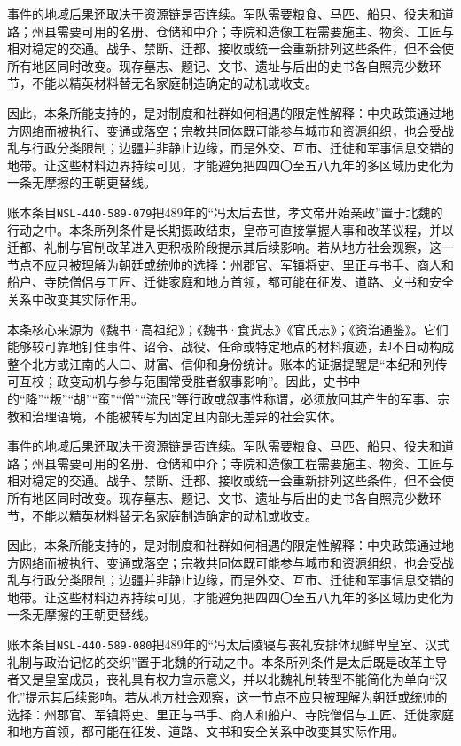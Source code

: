 事件的地域后果还取决于资源链是否连续。军队需要粮食、马匹、船只、役夫和道路；州县需要可用的名册、仓储和中介；寺院和造像工程需要施主、物资、工匠与相对稳定的交通。战争、禁断、迁都、接收或统一会重新排列这些条件，但不会使所有地区同时改变。现存墓志、题记、文书、遗址与后出的史书各自照亮少数环节，不能以精英材料替无名家庭制造确定的动机或收支。

因此，本条所能支持的，是对制度和社群如何相遇的限定性解释：中央政策通过地方网络而被执行、变通或落空；宗教共同体既可能参与城市和资源组织，也会受战乱与行政分类限制；边疆并非静止边缘，而是外交、互市、迁徙和军事信息交错的地带。让这些材料边界持续可见，才能避免把四四〇至五八九年的多区域历史化为一条无摩擦的王朝更替线。

账本条目\texttt{NSL-440-589-079}把489年的“冯太后去世，孝文帝开始亲政”置于北魏的行动之中。本条所列条件是长期摄政结束，皇帝可直接掌握人事和改革议程，并以迁都、礼制与官制改革进入更积极阶段提示其后续影响。若从地方社会观察，这一节点不应只被理解为朝廷或统帅的选择：州郡官、军镇将吏、里正与书手、商人和船户、寺院僧侣与工匠、迁徙家庭和地方首领，都可能在征发、道路、文书和安全关系中改变其实际作用。

本条核心来源为《魏书·高祖纪》；《魏书·食货志》《官氏志》；《资治通鉴》。它们能够较可靠地钉住事件、诏令、战役、任命或特定地点的材料痕迹，却不自动构成整个北方或江南的人口、财富、信仰和身份统计。账本的证据提醒是“本纪和列传可互校；政变动机与参与范围常受胜者叙事影响”。因此，史书中的“降”“叛”“胡”“蛮”“僧”“流民”等行政或叙事性称谓，必须放回其产生的军事、宗教和治理语境，不能被转写为固定且内部无差异的社会实体。

事件的地域后果还取决于资源链是否连续。军队需要粮食、马匹、船只、役夫和道路；州县需要可用的名册、仓储和中介；寺院和造像工程需要施主、物资、工匠与相对稳定的交通。战争、禁断、迁都、接收或统一会重新排列这些条件，但不会使所有地区同时改变。现存墓志、题记、文书、遗址与后出的史书各自照亮少数环节，不能以精英材料替无名家庭制造确定的动机或收支。

因此，本条所能支持的，是对制度和社群如何相遇的限定性解释：中央政策通过地方网络而被执行、变通或落空；宗教共同体既可能参与城市和资源组织，也会受战乱与行政分类限制；边疆并非静止边缘，而是外交、互市、迁徙和军事信息交错的地带。让这些材料边界持续可见，才能避免把四四〇至五八九年的多区域历史化为一条无摩擦的王朝更替线。

账本条目\texttt{NSL-440-589-080}把489年的“冯太后陵寝与丧礼安排体现鲜卑皇室、汉式礼制与政治记忆的交织”置于北魏的行动之中。本条所列条件是太后既是改革主导者又是皇室成员，丧礼具有权力宣示意义，并以北魏礼制转型不能简化为单向“汉化”提示其后续影响。若从地方社会观察，这一节点不应只被理解为朝廷或统帅的选择：州郡官、军镇将吏、里正与书手、商人和船户、寺院僧侣与工匠、迁徙家庭和地方首领，都可能在征发、道路、文书和安全关系中改变其实际作用。


